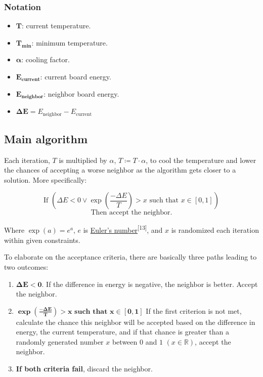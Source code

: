 \documentclass{article}
\begin{document}
\subsubsection{Notation}

\begin{itemize}
    \item \(\boldsymbol{T}\): current temperature.
    \item \(\boldsymbol{T_{\mathbf{min}}}\): minimum temperature.
    \item \(\boldsymbol{\alpha}\): cooling factor.
    \item \(\boldsymbol{E_{\mathbf{current}}}\): current board energy.
    \item \(\boldsymbol{E_{\mathbf{neighbor}}}\): neighbor board energy.
    \item \(\boldsymbol{\Delta E} = E_{\text{neighbor}} - E_{\text{current}}\)
\end{itemize}

\subsection{Main algorithm}

Each iteration, \(T\) is multiplied by \(\alpha\), \(T \coloneqq T \cdot \alpha\),
to cool the temperature and lower the chances of accepting a worse neighbor as the algorithm gets closer to a solution. More specifically:

\[
    \text{If } \left(\Delta E < 0 \lor \exp\left(\frac{-\Delta E}{T}\right) > x \text{ such that } x \in [0, 1] \right)
\]
\[
    \text{Then accept the neighbor.}
\]

Where \( \exp(a) = e^a \), \( e \) is \href{https://en.wikipedia.org/wiki/E_(mathematical_constant)}{Euler's number}\textsuperscript{[13]},
and \( x \) is randomized each iteration within given constraints.

To elaborate on the acceptance criteria, there are basically three paths leading to two outcomes:

\begin{enumerate}
    \item \(\boldsymbol{\Delta E < 0}\). If the difference in energy is negative, the neighbor is better. Accept the neighbor.
    \item \(\boldsymbol{\exp\left(\frac{-\Delta E}{T}\right) > x \textbf{ such that } x \in [0, 1]}\)
          If the first criterion is not met, calculate the chance this neighbor will be accepted based on the difference in energy,
          the current temperature, and if that chance is greater than a randomly generated number \(x\) between \(0\) and \(1\) \((x \in \mathbb{R})\), accept the neighbor.
    \item \textbf{If both criteria fail}, discard the neighbor.
\end{enumerate}
\end{document}
